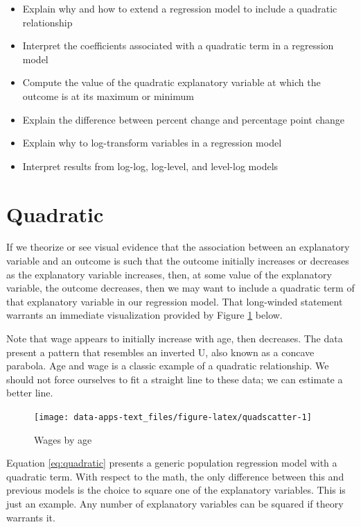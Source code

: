 \documentclass[
]{book}
\providecommand{\tightlist}{%
  \setlength{\itemsep}{0pt}\setlength{\parskip}{0pt}}
\begin{document}
\begin{itemize}
\tightlist
\item
  Explain why and how to extend a regression model to include a quadratic relationship
\item
  Interpret the coefficients associated with a quadratic term in a regression model
\item
  Compute the value of the quadratic explanatory variable at which the outcome is at its maximum or minimum
\item
  Explain the difference between percent change and percentage point change
\item
  Explain why to log-transform variables in a regression model
\item
  Interpret results from log-log, log-level, and level-log models
\end{itemize}

\hypertarget{quadratic}{%
\section{Quadratic}\label{quadratic}}

If we theorize or see visual evidence that the association between an explanatory variable and an outcome is such that the outcome initially increases or decreases as the explanatory variable increases, then, at some value of the explanatory variable, the outcome decreases, then we may want to include a quadratic term of that explanatory variable in our regression model. That long-winded statement warrants an immediate visualization provided by Figure \ref{fig:quadscatter} below.

Note that wage appears to initially increase with age, then decreases. The data present a pattern that resembles an inverted U, also known as a concave parabola. Age and wage is a classic example of a quadratic relationship. We should not force ourselves to fit a straight line to these data; we can estimate a better line.

\begin{figure}

{\centering \texttt{[image: data-apps-text\_files/figure-latex/quadscatter-1]} 

}

\caption{Wages by age}\label{fig:quadscatter}
\end{figure}

Equation \eqref{eq:quadratic} presents a generic population regression model with a quadratic term. With respect to the math, the only difference between this and previous models is the choice to square one of the explanatory variables. This is just an example. Any number of explanatory variables can be squared if theory warrants it.
\end{document}
